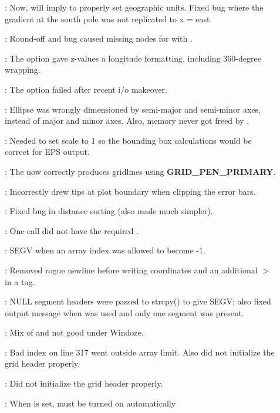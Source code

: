 \begin{description}
	\item []:	Now,  will imply  to properly set geographic units.
		Fixed bug where the gradient at the south pole was not replicated to x = east.
	\item []:	Round-off and bug caused missing nodes for  with .
	\item []:	The  option gave z-values a longitude formatting, including 360-degree wrapping.
	\item []:	The  option failed after recent i/o makeover.
	\item []:	Ellipse was wrongly dimensioned by semi-major and semi-minor
		axes, instead of major and minor axes.  Also, memory never got freed by .
	\item []:	Needed to set scale to 1 so the bounding box
		calculations would be correct for EPS output.
	\item []:	The  now correctly produces gridlines using \textbf{GRID\_PEN\_PRIMARY}.
	\item []:	Incorrectly drew tips at plot boundary when clipping the error bars.
	\item []:	Fixed bug in distance sorting (also made much simpler).
	\item []:	One  call did not have the required .
	\item []:	SEGV when an array index was allowed to become -1.
	\item []:	Removed rogue newline before writing coordinates and an additional $>$ in a tag.
	\item []:	NULL segment headers were passed to strcpy() to give SEGV; also
		fixed output message when  was used and only one segment was present.
	\item []:	Mix of  and  not good under Windoze.
	\item []:	Bad index on line 317 went outside array limit.  Also did not initialize the grid header properly.
	\item []:	Did not initialize the grid header properly.
	\item []:	When  is set,  must be turned on automatically

\end{description}
